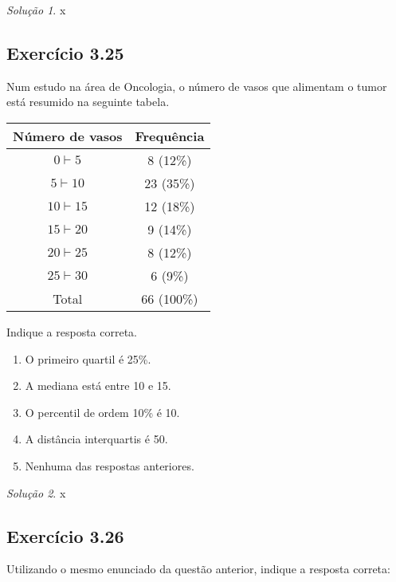 \documentclass[
]{latex/krantz}
\providecommand{\tightlist}{%
  \setlength{\itemsep}{0pt}\setlength{\parskip}{0pt}}
\theoremstyle{definition}
\theoremstyle{definition}
\theoremstyle{definition}
\theoremstyle{definition}
\theoremstyle{remark}
\newtheorem*{solution}{Solução}
\begin{document}
\begin{solution}
x
\end{solution}

\hypertarget{exr3-25}{%
\subsection*{Exercício 3.25}\label{exr3-25}}

Num estudo na área de Oncologia, o número de vasos que alimentam o tumor está resumido na seguinte tabela.

\begin{longtable}[]{@{}cc@{}}
\toprule\noalign{}
Número de vasos & Frequência \\
\midrule\noalign{}
\endhead
\bottomrule\noalign{}
\endlastfoot
\(0 \vdash 5\) & 8 (12\%) \\
\(5 \vdash 10\) & 23 (35\%) \\
\(10 \vdash 15\) & 12 (18\%) \\
\(15 \vdash 20\) & 9 (14\%) \\
\(20 \vdash 25\) & 8 (12\%) \\
\(25 \vdash 30\) & 6 (9\%) \\
Total & 66 (100\%) \\
\end{longtable}

Indique a resposta correta.

\begin{enumerate}
\def\labelenumi{\alph{enumi})}
\tightlist
\item
  O primeiro quartil é 25\%.
\item
  A mediana está entre 10 e 15.
\item
  O percentil de ordem 10\% é 10.
\item
  A distância interquartis é 50.
\item
  Nenhuma das respostas anteriores.
\end{enumerate}

\begin{solution}
x
\end{solution}

\hypertarget{exr3-26}{%
\subsection*{Exercício 3.26}\label{exr3-26}}

Utilizando o mesmo enunciado da questão anterior, indique a resposta correta:
\end{document}
